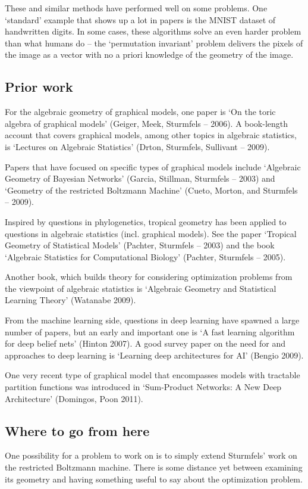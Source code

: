\documentclass[11pt]{article}
\begin{document}
These and similar methods have performed well on some problems.  One `standard'
example that shows up a lot in papers is the MNIST dataset of handwritten
digits.  In some cases, these algorithms solve an even harder problem than what
humans do -- the `permutation invariant' problem delivers the pixels of the
image as a vector with no a priori knowledge of the geometry of the image.

\subsection{Prior work}

For the algebraic geometry of graphical models, one paper is `On the toric
algebra of graphical models' (Geiger, Meek, Sturmfels -- 2006).  A book-length
account that covers graphical models, among other topics in algebraic
statistics, is `Lectures on Algebraic Statistics' (Drton, Sturmfels, Sullivant
-- 2009).  

Papers that have focused on specific types of graphical models include
`Algebraic Geometry of Bayesian Networks' (Garcia, Stillman, Sturmfels -- 2003)
and `Geometry of the restricted Boltzmann Machine' (Cueto, Morton, and Sturmfels
-- 2009).  

Inspired by questions in phylogenetics, tropical geometry has been applied to
questions in algebraic statistics (incl. graphical models).  See the paper
`Tropical Geometry of Statistical Models' (Pachter, Sturmfels -- 2003) and the
book `Algebraic Statistics for Computational Biology' (Pachter, Sturmfels --
2005).

Another book, which builds theory for considering optimization problems from the
viewpoint of algebraic statistics is `Algebraic Geometry and Statistical
Learning Theory' (Watanabe 2009).

From the machine learning side, questions in deep learning have spawned a large
number of papers, but an early and important one is `A fast learning algorithm for
deep belief nets' (Hinton 2007).  A good survey paper on the need for and
approaches to deep learning is `Learning deep architectures for AI' (Bengio
2009).

One very recent type of graphical model that encompasses models with tractable
partition functions was introduced in `Sum-Product Networks: A New Deep
Architecture' (Domingos, Poon 2011).

\subsection{Where to go from here}

One possibility for a problem to work on is to simply extend Sturmfels' work on
the restricted Boltzmann machine.  There is some distance yet between examining
its geometry and having something useful to say about the optimization problem.
\end{document}
